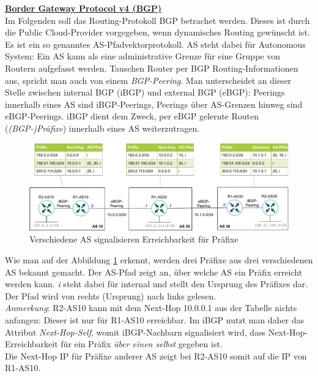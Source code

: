 \textbf{\underline{Border Gateway Protocol v4 (BGP)}}\\
Im Folgenden soll das Routing-Protokoll \gls{BGP} betrachet werden. Dieses ist durch die Public Cloud-Provider vorgegeben, wenn dynamisches Routing gewünscht ist. Es ist ein so genanntes \gls{AS}-Pfadvektorprotokoll. \gls{AS} steht dabei für Autonomous System: Ein \gls{AS} kann als eine administrative \glqq Grenze\grqq{} für eine Gruppe von Routern aufgefasst werden. Tauschen Router per \gls{BGP} Routing-Informationen aus, spricht man auch von einem \textit{BGP-Peering}. Man unterscheidet an dieser Stelle zwischen internal \gls{BGP} (iBGP) und external \gls{BGP} (eBGP): Peerings innerhalb eines \gls{AS} sind iBGP-Peerings, Peerings über \gls{AS}-Grenzen hinweg sind eBGP-Peerings. iBGP dient dem Zweck, per eBGP gelernte Routen (\textit{(BGP-)Präfixe}) innerhalb eines \gls{AS} weiterzutragen.

\begin{figure}[h]
  \centering
  \includegraphics[scale=0.75]{Figures/ebgp_peerings.pdf}
  \caption{Verschiedene AS signalisieren Erreichbarkeit für Präfixe}
  \label{grafik: ebgp_peerings}
\end{figure}\FloatBarrier

Wie man auf der Abbildung \ref{grafik: ebgp_peerings} erkennt, werden drei Präfixe aus drei verschiedenen \gls{AS} bekannt gemacht. Der \gls{AS}-Pfad zeigt an, über welche \gls{AS} ein Präfix erreicht werden kann. \textit{i} steht dabei für internal und stellt den Ursprung des Präfixes dar. Der Pfad wird von rechts (Ursprung) nach links gelesen.\cite{odom2010}\\
\textit{Anmerkung}: R2-AS10 kann mit dem Next-Hop 10.0.0.1 aus der Tabelle nichts anfangen: Dieser ist nur für R1-AS10 erreichbar. Im iBGP nutzt man daher das Attribut \textit{Next-Hop-Self}, womit iBGP-Nachbarn signalisiert wird, dass Next-Hop-Erreichbarkeit für ein Präfix \textit{über einen selbst} gegeben ist.\cite[S.468-471]{odom2010}\\
Die Next-Hop IP für Präfixe anderer \gls{AS} zeigt bei R2-AS10 somit auf die IP von R1-AS10.

